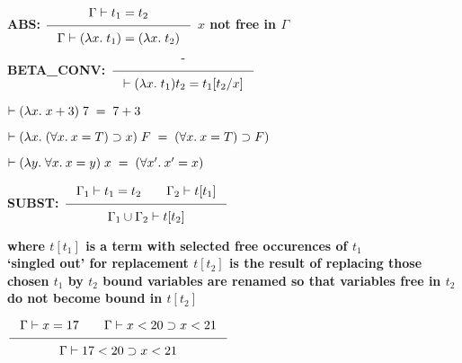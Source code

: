 \vskip18mm

\bspindent\LARGE\bf
{\Large\bf ABS:\quad}
$\Rule{\Gamma \vdash t_1 = t_2}
{\Gamma \vdash (\lambda x. \; t_1) = (\lambda x.\; t_2) }$
\vskip4mm
{\Large\bf $x$ not free in $\Gamma$}
\espindent



\vskip15mm
\bspindent\LARGE\bf
{\Large\bf BETA\_CONV:\quad}
$\Rule{\mbox{-}}
{ \vdash (\lambda x. \; t_1) t_2 = t_1 [ t_2 / x ] }$
\espindent


\vskip 15mm


\vskip 7mm

\vskip 7mm
\vskip5mm
\bspindent\LARGE
$\begin{array}[t]{@{}l}
\vdash (\lambda x.\; x+3)\;7 \;=\; 7+3 \\[3mm]
\vdash (\lambda x.\; (\forall x.\: x=T) \supset x)\;F \;=\; 
(\forall x.\: x=T) \supset F) \\[3mm]
\vdash (\lambda y. \; \forall x.\: x=y)\;x \; = \; (\forall x'.\: x'=x)
\end{array}$
\espindent




\vskip15mm
\bspindent\LARGE\bf
{\Large\bf SUBST:\quad}
$\Rule{\Gamma_1 \vdash t_1 = t_2 \qquad \Gamma_2 \vdash t [ t_1 ] }
{\Gamma_1 \cup \Gamma_2 \vdash t [ t_2 ]}$
\espindent

\vskip 7mm
\bpindent\LARGE\bf
where
\epindent
\vskip5mm
\bspindent\Large\bf
\( t [ t_1 ] \) is a term with 
selected free occurences of $t_1$\\ `singled out' for 
replacement
\vskip 5mm
\( t [ t_2 ] \) is the result of replacing those chosen $t_1$ by $t_2$
\vskip 5mm
bound variables are renamed so that variables free in $t_2$
do not become bound in $t [t_2]$
\espindent



\vskip 15mm

\bspindent\LARGE\bf
$\Rule
{\Gamma \vdash x=17 \qquad \Gamma \vdash x<20 \supset x<21}
{\Gamma \vdash 17<20 \supset x<21}$
\vskip 20mm

